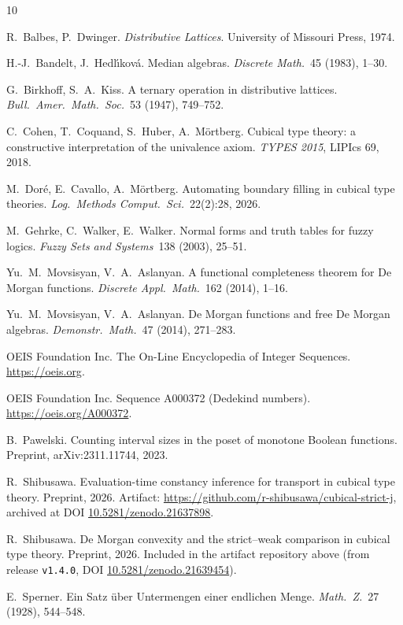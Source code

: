 \documentclass[11pt]{amsart}
\theoremstyle{definition}
\begin{document}
\begin{thebibliography}{10}

R.~Balbes, P.~Dwinger.
\newblock \emph{Distributive Lattices}.
\newblock University of Missouri Press, 1974.

H.-J.~Bandelt, J.~Hedl\'{\i}kov\'a.
\newblock Median algebras.
\newblock \emph{Discrete Math.}\ 45 (1983), 1--30.

G.~Birkhoff, S.~A.~Kiss.
\newblock A ternary operation in distributive lattices.
\newblock \emph{Bull.\ Amer.\ Math.\ Soc.}\ 53 (1947), 749--752.

C.~Cohen, T.~Coquand, S.~Huber, A.~M\"ortberg.
\newblock Cubical type theory: a constructive interpretation of the
  univalence axiom.
\newblock \emph{TYPES 2015}, LIPIcs 69, 2018.

M.~Dor\'e, E.~Cavallo, A.~M\"ortberg.
\newblock Automating boundary filling in cubical type theories.
\newblock \emph{Log.\ Methods Comput.\ Sci.}\ 22(2):28, 2026.

M.~Gehrke, C.~Walker, E.~Walker.
\newblock Normal forms and truth tables for fuzzy logics.
\newblock \emph{Fuzzy Sets and Systems}\ 138 (2003), 25--51.

Yu.~M.~Movsisyan, V.~A.~Aslanyan.
\newblock A functional completeness theorem for De Morgan functions.
\newblock \emph{Discrete Appl.\ Math.}\ 162 (2014), 1--16.

Yu.~M.~Movsisyan, V.~A.~Aslanyan.
\newblock De Morgan functions and free De Morgan algebras.
\newblock \emph{Demonstr.\ Math.}\ 47 (2014), 271--283.

OEIS Foundation Inc.
\newblock The On-Line Encyclopedia of Integer Sequences.
\newblock \url{https://oeis.org}.

OEIS Foundation Inc.
\newblock Sequence A000372 (Dedekind numbers).
\newblock \url{https://oeis.org/A000372}.

B.~Pawelski.
\newblock Counting interval sizes in the poset of monotone Boolean
  functions.
\newblock Preprint, arXiv:2311.11744, 2023.

R.~Shibusawa.
\newblock Evaluation-time constancy inference for transport in
  cubical type theory.
\newblock Preprint, 2026.  Artifact:
  \url{https://github.com/r-shibusawa/cubical-strict-j}, archived at
  DOI \href{https://doi.org/10.5281/zenodo.21637898}%
  {10.5281/zenodo.21637898}.

R.~Shibusawa.
\newblock De Morgan convexity and the strict--weak comparison in
  cubical type theory.
\newblock Preprint, 2026.  Included in the artifact repository above
  (from release \texttt{v1.4.0}, DOI
  \href{https://doi.org/10.5281/zenodo.21639454}%
  {10.5281/zenodo.21639454}).

E.~Sperner.
\newblock Ein Satz \"uber Untermengen einer endlichen Menge.
\newblock \emph{Math.\ Z.}\ 27 (1928), 544--548.

\end{thebibliography}
\end{document}
